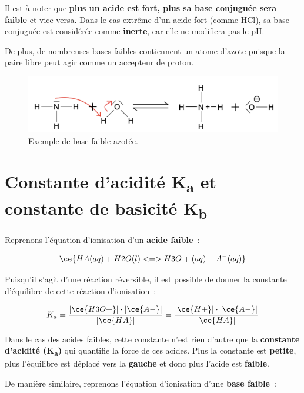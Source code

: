 \documentclass[
  11pt,
  french,
  a4paper,
  openany]{book}
\begin{document}
Il est à noter que \textbf{plus un acide est fort, plus sa base conjuguée sera faible} et vice versa. Dans le cas extrême d'un acide fort (comme HCl), sa base conjuguée est considérée comme \textbf{inerte}, car elle ne modifiera pas le pH.

\clearpage

De plus, de nombreuses bases faibles contiennent un atome d'azote puisque la paire libre peut agir comme un accepteur de proton.

\begin{figure}

{\centering \includegraphics[width=0.5\linewidth]{images/acides-bases-3} 

}

\caption{Exemple de base faible azotée.}\label{fig:acides-bases-3}
\end{figure}

\hypertarget{constante-dacidituxe9-ka-et-constante-de-basicituxe9-kb}{%
\section{\texorpdfstring{Constante d'acidité K\textsubscript{a} et constante de basicité K\textsubscript{b}}{Constante d'acidité Ka et constante de basicité Kb}}\label{constante-dacidituxe9-ka-et-constante-de-basicituxe9-kb}}

Reprenons l'équation d'ionisation d'un \textbf{acide faible}~:

\[
\ce{HA(aq) + H2O(l) <=> H3O+(aq) + A^{-}(aq)}
\]

Puisqu'il s'agit d'une réaction réversible, il est possible de donner la constante d'équilibre de cette réaction d'ionisation~:

\[
K_a = \frac{|\ce{H3O+}| \cdot |\ce{A-}|}{|\ce{HA}|} =  \frac{|\ce{H+}| \cdot |\ce{A-}|}{|\ce{HA}|}
\]

Dans le cas des acides faibles, cette constante n'est rien d'autre que la \textbf{constante d'acidité (K\textsubscript{a})} qui quantifie la force de ces acides. Plus la constante est \textbf{petite}, plus l'équilibre est déplacé vers la \textbf{gauche} et donc plus l'acide est \textbf{faible}.

De manière similaire, reprenons l'équation d'ionisation d'une \textbf{base faible}~:
\end{document}
